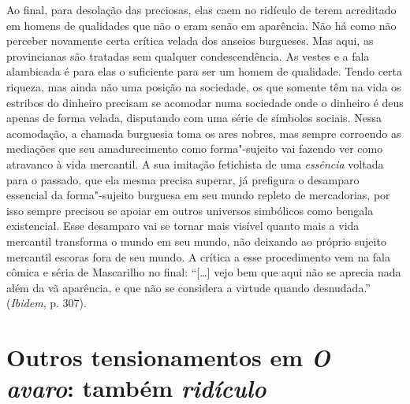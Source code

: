 Ao final, para desolação das preciosas, elas caem no ridículo de terem
acreditado em homens de qualidades que não o eram senão em aparência.
Não há como não perceber novamente certa crítica velada dos anseios
burgueses. Mas aqui, as provincianas são tratadas sem qualquer
condescendência. As vestes e a fala alambicada é para elas o suficiente
para ser um homem de qualidade. Tendo certa riqueza, mas ainda não uma
posição na sociedade, os que somente têm na vida os estribos do dinheiro
precisam se acomodar numa sociedade onde o dinheiro é deus apenas de
forma velada, disputando com uma série de símbolos sociais. Nessa
acomodação, a chamada burguesia toma os ares nobres, mas sempre
corroendo as mediações que seu amadurecimento como forma"-sujeito vai
fazendo ver como atravanco à vida mercantil. A sua imitação fetichista
de uma \emph{essência} voltada para o passado, que ela mesma precisa
superar, já prefigura o desamparo essencial da forma"-sujeito burguesa em
seu mundo repleto de mercadorias, por isso sempre precisou se apoiar em
outros universos simbólicos como bengala existencial. Esse desamparo vai
se tornar mais visível quanto mais a vida mercantil transforma o mundo
em seu mundo, não deixando ao próprio sujeito mercantil escoras fora de
seu mundo. A crítica a esse procedimento vem na fala cômica e séria de
Mascarilho no final: ``[\ldots{}] vejo bem que aqui não se aprecia nada
além da vã aparência, e que não se considera a virtude quando
desnudada.'' (\emph{Ibidem}, p. 307).

\section*{Outros tensionamentos em \emph{O avaro}: também \emph{ridículo}}


